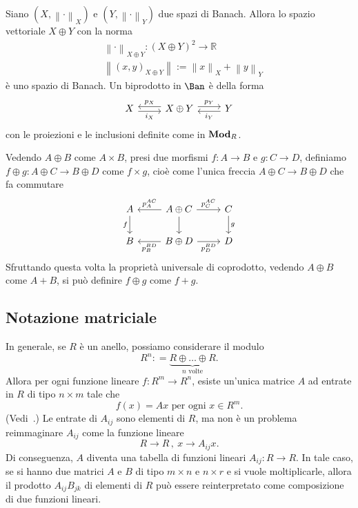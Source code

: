 \begin{example}
  Siano \((X, \left\lVert \cdot \right\rVert_X)\) e
  \((Y, \left\lVert \cdot \right\rVert_Y)\) due spazi di Banach. Allora lo
  spazio vettoriale \(X \oplus Y\) con la norma
  \begin{align*}
    & \left\lVert \cdot \right\rVert_{X \oplus Y} : (X \oplus Y)^2 \to \mathbb{R} \\
    & \left\lVert (x, y)_{X \oplus Y} \right\rVert := \left\lVert x \right\rVert_X + \left\lVert y \right\rVert_Y
  \end{align*}
  è uno spazio di Banach. Un biprodotto in \(\Ban\) è della forma
  \[
    \begin{tikzcd}
      X \ar["{i_X}", r, shift right, swap] & X \oplus Y \ar["{p_X}", l, shift
      right, swap] \ar["{p_Y}", r, shift left] & Y \ar["{i_Y}", l, shift
      left]
    \end{tikzcd}
  \]
  con le proiezioni e le inclusioni definite come in \(\mathbf{Mod}_R\).
\end{example}

Vedendo \(A \oplus B\) come \(A \times B\), presi due morfismi
\(f : A \to B\) e \(g : C \to D\), definiamo
\(f \oplus g : A \oplus C \to B \oplus D\) come \(f \times g\), cioè
come l'unica freccia \(A \oplus C \to B \oplus D\) che fa commutare
\[
  \begin{tikzcd}
    A \ar["{f}", d, swap] & A \oplus C \ar["{p_A^{AC}}", l, swap]
    \ar["{}", d] \ar["{p_C^{AC}}", r] & C \ar["{g}", d] \\
    B & B \oplus D \ar["{p_B^{BD}}", l] \ar["{p_D^{BD}}", r, swap] & D
  \end{tikzcd}
\]
Sfruttando questa volta la proprietà universale di coprodotto, vedendo
\(A \oplus B\) come \(A + B\), si può definire \(f \oplus g\) come
\(f + g\).


\subsection{Notazione matriciale}

\begin{example}
  In generale, se \(R\) è un anello, possiamo considerare il modulo
  \[
    R^n : = \underbrace{R \oplus \dots{} \oplus R}_{n \text{ volte}}.
  \]
  Allora per ogni funzione lineare \(f : R^m \to R^n\), esiste un'unica
  matrice \(A\) ad entrate in \(R\) di tipo \(n \times m\) tale che
  \[
    f(x) = A x \text{ per ogni } x \in R^m .
  \]
  (Vedi~\cite{aluffi:algebra}.) Le entrate di \(A_{ij}\) sono elementi
  di \(R\), ma non è un problema reimmaginare \(A_{ij}\) come la
  funzione lineare
  \[
    R \to R\,,\ x \to A_{ij}x .
  \]
  Di conseguenza, \(A\) diventa una tabella di funzioni lineari
  \(A_{ij} : R \to R\). In tale caso, se si hanno due matrici \(A\) e
  \(B\) di tipo \(m \times n\) e \(n \times r\) e si vuole
  moltiplicarle, allora il prodotto \(A_{ij} B_{jk}\) di elementi di
  \(R\) può essere reinterpretato come composizione di due funzioni
  lineari.
\end{example}

